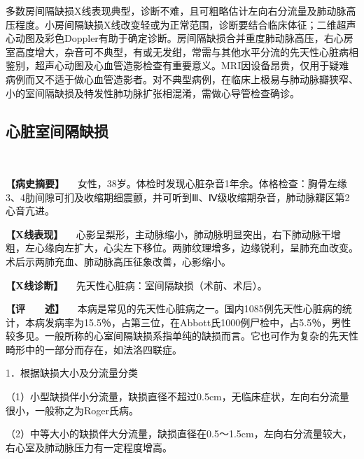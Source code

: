 多数房间隔缺损X线表现典型，诊断不难，且可粗略估计左向右分流量及肺动脉高压程度。小房间隔缺损X线改变轻或为正常范围，诊断要结合临床体征；二维超声心动图及彩色Doppler有助于确定诊断。房间隔缺损合并重度肺动脉高压，右心房室高度增大，杂音可不典型，有或无发绀，常需与其他水平分流的先天性心脏病相鉴别，超声心动图及心血管造影检查有重要意义。MRI因设备昂贵，仅用于疑难病例而又不适于做心血管造影者。对不典型病例，在临床上极易与肺动脉瓣狭窄、小的室间隔缺损及特发性肺功脉扩张相混淆，需做心导管检查确诊。

\subsection{心脏室间隔缺损}

\begin{figure}
  \centering
{}
\\
\caption{}
\label{fig4-2-2}
\end{figure}

\textbf{【病史摘要】}
　女性，38岁。体检时发现心脏杂音1年余。体格检查：胸骨左缘3、4肋间隙可扪及收缩期细震颤，并可听到Ⅲ、Ⅳ级收缩期杂音，肺动脉瓣区第2心音亢进。

\textbf{【X线表现】}
　心影呈梨形，主动脉缩小，肺动脉明显突出，右下肺动脉干增粗，左心缘向左扩大，心尖左下移位。两肺纹理增多，边缘锐利，呈肺充血改变。术后示两肺充血、肺动脉高压征象改善，心影缩小。

\textbf{【X线诊断】} 　先天性心脏病：室间隔缺损（术前、术后）。

\textbf{【评　　述】}
　本病是常见的先天性心脏病之一。国内1085例先天性心脏病的统计，本病发病率为15.5％，占第三位，在Abbott氏1000例尸检中，占5.5％，男性较多见。一般所称的心室间隔缺损系指单纯的缺损而言。它也可作为复杂的先天性畸形中的一部分而存在，如法洛四联症。

1．根据缺损大小及分流量分类

（1）小型缺损伴小分流量，缺损直径不超过0.5cm，无临床症状，左向右分流量很小，一般称之为Roger氏病。

（2）中等大小的缺损伴大分流量，缺损直径在0.5～1.5cm，左向右分流量较大，右心室及肺动脉压力有一定程度增高。

